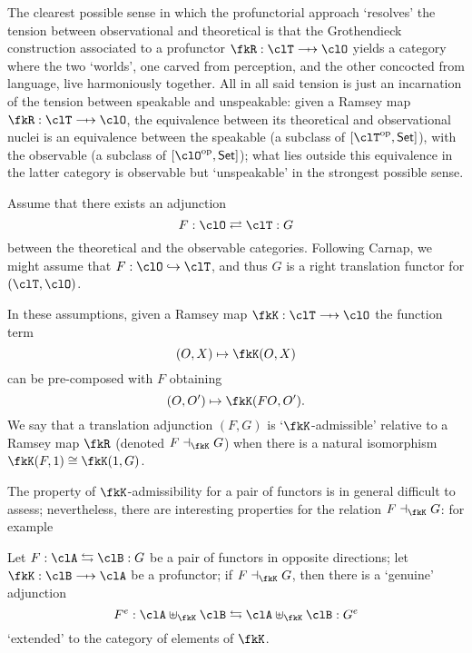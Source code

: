\begin{remark}\label{resoudre_la_tension}
  The clearest possible sense in which the profunctorial approach `resolves' the tension between observational and theoretical is that the Gro\-then\-dieck construction associated to a profunctor $\fkR : \clT \pto \clO$ yields a category where the two `worlds', one carved from perception, and the other concocted from language, live harmoniously together. All in all said tension is just an incarnation of the tension between speakable and unspeakable: given a Ramsey map $\fkR : \clT \pto \clO$, the equivalence between its theoretical and observational nuclei is an equivalence between the speakable (a subclass of $[\clT^\op,\Set]$), with the observable (a subclass of $[\clO^\op,\Set]$); what lies outside this equivalence in the latter category is observable but `unspeakable' in the strongest possible sense.
\end{remark}
\begin{remark}\label{carnap_translation_functors}
  Assume that there exists an adjunction
  \[
    F : \clO \rightleftarrows \clT : G
  \]
  between the theoretical and the observable categories. Following Carnap, we might assume that $F : \clO \hookrightarrow \clT$, and thus $G$ is a right translation functor for $(\clT, \clO)$.

  In these assumptions, given a Ramsey map $\fkK : \clT \pto \clO$ the function term
  \[(O,X) \mapsto \fkK(O, X)\]
  can be pre-composed with $F$ obtaining
  \[(O,O')\mapsto \fkK( F O, O').\]
  We say that a translation adjunction $(F,G)$ is `$\fkK$-admissible' relative to a Ramsey map $\fkR$ (denoted $F \dashv_\fkK G$) when there is a natural isomorphism $\fkK(F,1)\cong\fkK(1,G)$.
\end{remark}
The property of $\fkK$-admissibility for a pair of functors is in general difficult to assess; nevertheless, there are interesting properties for the relation $F\dashv_\fkK G$: for example
\begin{theorem}
  Let $F : \clA \leftrightarrows \clB: G$ be a pair of functors in opposite directions; let $\fkK : \clB \pto \clA$ be a profunctor; if $F\dashv_\fkK G$, then there is a `genuine' adjunction
  \[ F^e : \clA\uplus_\fkK\clB \leftrightarrows \clA\uplus_\fkK\clB : G^e \]
  `extended' to the category of elements of $\fkK$.
\end{theorem}